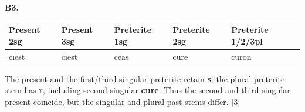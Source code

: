 \par\begin{minipage}{\linewidth}\raggedright
\textbf{B3.}

\par\begingroup
\fontsize{10.5}{13.2}\selectfont
\setlength{\LTleft}{0pt}\setlength{\LTright}{\fill}
\noindent
\begin{tabular}{@{}>{\raggedright\arraybackslash}p{20.8mm}>{\raggedright\arraybackslash}p{20.8mm}>{\raggedright\arraybackslash}p{22.47mm}>{\raggedright\arraybackslash}p{22.47mm}>{\raggedright\arraybackslash}p{26.21mm}@{}}
\toprule
\textbf{Present 2sg} & \textbf{Present 3sg} & \textbf{Preterite 1sg} & \textbf{Preterite 2sg} & \textbf{Preterite 1/\allowbreak{}2/\allowbreak{}3pl} \\
\midrule
cīest & cīest & cēas & cure & curon \\
\bottomrule
\end{tabular}
\par\endgroup

The present and the first/\allowbreak{}third singular preterite retain \textbf{s}; the plural-preterite stem has \textbf{r}, including second-singular \textbf{cure}. Thus the second and third singular present coincide, but the singular and plural past stems differ. [3]

\end{minipage}\par\addvspace{4pt}

